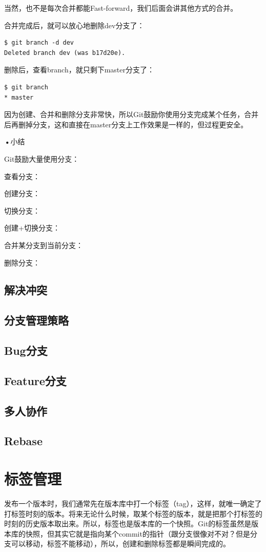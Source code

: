 \documentclass[•]{article}
\begin{document}
\begin{CJK}{UTF8}{gbsn}
当然，也不是每次合并都能Fast-forward，我们后面会讲其他方式的合并。

合并完成后，就可以放心地删除dev分支了：
\begin{lstlisting}
$ git branch -d dev
Deleted branch dev (was b17d20e).
\end{lstlisting}
删除后，查看branch，就只剩下master分支了：
\begin{lstlisting}
$ git branch
* master
\end{lstlisting}
因为创建、合并和删除分支非常快，所以Git鼓励你使用分支完成某个任务，合并后再删掉分支，这和直接在master分支上工作效果是一样的，但过程更安全。

\textbf{•}{小结}

Git鼓励大量使用分支：

查看分支：

创建分支：

切换分支：

创建+切换分支：

合并某分支到当前分支：

删除分支：

\subsection{解决冲突}
\subsection{分支管理策略}
\subsection{Bug分支}
\subsection{Feature分支}
\subsection{多人协作}
\subsection{Rebase}
\section{标签管理}
\qquad 发布一个版本时，我们通常先在版本库中打一个标签（tag），这样，就唯一确定了打标签时刻的版本。将来无论什么时候，取某个标签的版本，就是把那个打标签的时刻的历史版本取出来。所以，标签也是版本库的一个快照。Git的标签虽然是版本库的快照，但其实它就是指向某个commit的指针（跟分支很像对不对？但是分支可以移动，标签不能移动），所以，创建和删除标签都是瞬间完成的。


\end{CJK}
\end{document}
